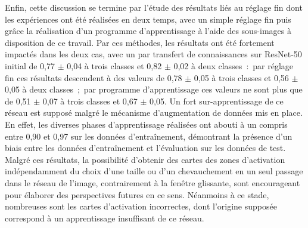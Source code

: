 Enfin, cette discussion se termine par l'étude des résultats liés au réglage fin dont les expériences ont été réalisées en deux temps, avec un simple réglage fin puis grâce la réalisation d'un programme d'apprentissage à l'aide des sous-images à disposition de ce travail. Par ces méthodes, les résultats ont été fortement impactés dans les deux cas, avec un \fscore{} par transfert de connaissances sur ResNet-50 initial de 0,77 $\pm$ 0,04 à trois classes et 0,82 $\pm$ 0,02 à deux classes~:~par réglage fin ces résultats descendent à des valeurs de 0,78 $\pm$ 0,05 à trois classes et 0,56 $\pm$ 0,05 à deux classes~;~par programme d'apprentissage ces valeurs ne sont plus que de 0,51 $\pm$ 0,07 à trois classes et 0,67 $\pm$ 0,05. Un fort sur-apprentissage de ce réseau est supposé malgré le mécanisme d'augmentation de données mis en place. En effet, les diverses phases d'apprentissage réalisées ont abouti à un \fscore{} compris entre 0,90 et 0,97 sur les données d'entraînement, démontrant la présence d'un biais entre les données d'entraînement et l'évaluation sur les données de test. Malgré ces résultats, la possibilité d'obtenir des cartes des zones d'activation indépendamment du choix d'une taille ou d'un chevauchement en un seul passage dans le réseau de l'image, contrairement à la fenêtre glissante, sont encourageant pour élaborer des perspectives futures en ce sens. Néanmoins à ce stade, nombreuses sont les cartes d'activation incorrectes, dont l'origine supposée correspond à un apprentissage insuffisant de ce réseau.\par